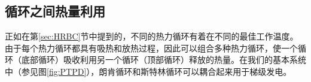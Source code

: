 \subsection{循环之间热量利用}
正如在第\ref{sec:HRBC}节中提到的，不同的热力循环有着在不同的最佳工作温度。由于每个热力循环都具有吸热和放热过程，因此可以组合多种热力循环，使一个循环（底部循环）吸收利用另一个循环（顶部循环）释放的热量。在我们的基本系统中（参见图\ref{fig:PTPD}），朗肯循环和斯特林循环可以耦合起来用于梯级发电。


